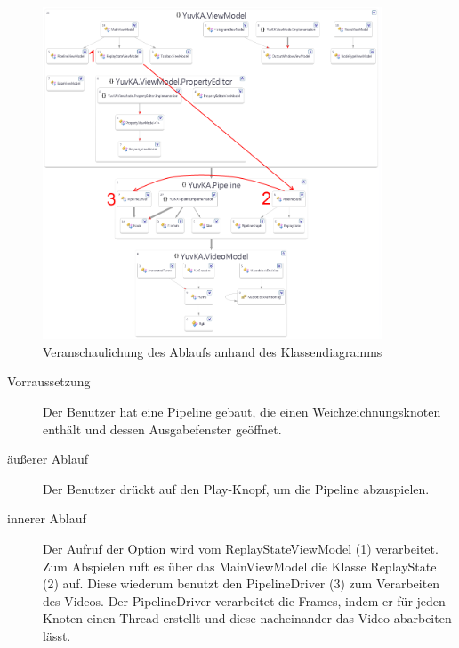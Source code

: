 \begin{figure}[h!]
\begin{center}
\includegraphics[width=0.9\textwidth]{Diagrams/visualization_TC3.png}
\end{center}
\caption{Veranschaulichung des Ablaufs anhand des Klassendiagramms}
\end{figure}
\begin{description}
	\item[Vorraussetzung] Der Benutzer hat eine Pipeline gebaut, die einen Weichzeichnungsknoten enthält und dessen Ausgabefenster geöffnet.
	\item[äußerer Ablauf] Der Benutzer drückt auf den Play-Knopf, um die Pipeline abzuspielen.
	\item[innerer Ablauf] Der Aufruf der Option wird vom ReplayStateViewModel (1) verarbeitet. Zum Abspielen ruft es  über das MainViewModel die Klasse ReplayState (2) auf. Diese wiederum benutzt den PipelineDriver (3) zum Verarbeiten des Videos. Der PipelineDriver verarbeitet die Frames, indem er für jeden Knoten einen Thread erstellt und diese nacheinander das Video abarbeiten lässt.
\end{description}
